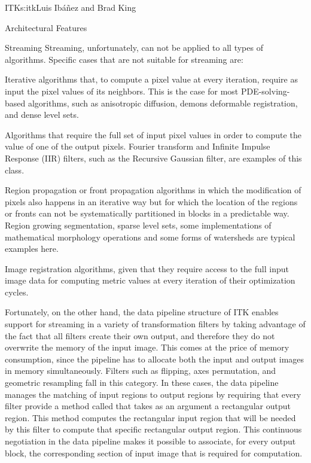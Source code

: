 \begin{aosachapter}{ITK}{s:itk}{Luis Ib\'{a}\~{n}ez and Brad King}
\begin{aosasect1}{Architectural Features}
\begin{aosasect2}{Streaming}
Streaming, unfortunately, can not be applied to all types of algorithms. Specific
cases that are not suitable for streaming are:

\begin{aosaitemize}
\item Iterative algorithms that, to compute a pixel value at every iteration,
require as input the pixel values of its neighbors. This is the case for
most PDE-solving-based algorithms, such as anisotropic diffusion, demons
deformable registration, and dense level sets.
\item Algorithms that require the full set of input pixel values in order to
compute the value of one of the output pixels. Fourier transform and Infinite
Impulse Response (IIR) filters, such as the Recursive Gaussian filter, are
examples of this class.
\item Region propagation or front propagation algorithms in which the
modification of pixels also happens in an iterative way but for which the
location of the regions or fronts can not be systematically partitioned in
blocks in a predictable way. Region growing segmentation, sparse level sets,
some implementations of mathematical morphology operations and some forms of
watersheds are typical examples here.
\item Image registration algorithms, given that they require access to
the full input image data for computing metric values at every iteration of
their optimization cycles.
\end{aosaitemize}

Fortunately, on the other hand, the data pipeline structure of ITK enables
support for streaming in a variety of transformation filters by taking
advantage of the fact that all filters create their own output, and therefore
they do not overwrite the memory of the input image. This comes at the price of
memory consumption, since the pipeline has to allocate both the input and
output images in memory simultaneously. Filters such as flipping, axes
permutation, and geometric resampling fall in this category. In these cases,
the data pipeline manages the matching of input regions to output regions by
requiring that every filter provide a method called
 that takes as an argument a rectangular
output region. This method computes the rectangular input region that will be
needed by this filter to compute that specific rectangular output region. This
continuous negotiation in the data pipeline makes it possible to associate, for every
output block, the corresponding section of input image that is required for
computation.


\end{aosasect2}
\end{aosasect1}
\end{aosachapter}
